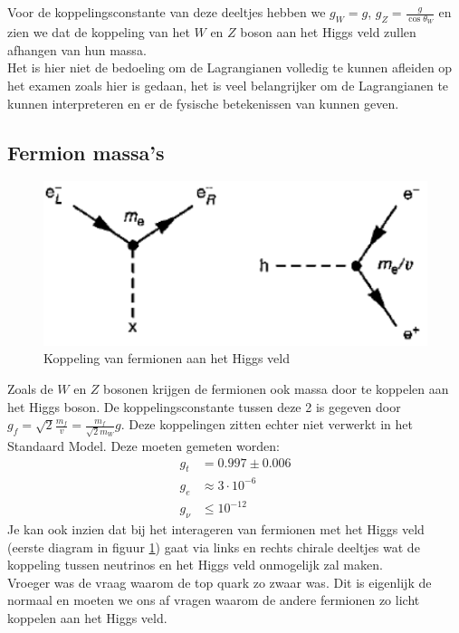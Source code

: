 \documentclass[../main.tex]{subfiles}
\begin{document}
Voor de koppelingsconstante van deze deeltjes hebben we $g_W=g$, $g_Z= \frac{g}{\cos\theta_W}$ en zien we dat de koppeling van het $W$ en $Z$ boson aan het Higgs veld zullen afhangen van hun massa.\\
{\color{red} Het is hier niet de bedoeling om de Lagrangianen volledig te kunnen afleiden op het examen zoals hier is gedaan, het is veel belangrijker om de Lagrangianen te kunnen interpreteren en er de fysische betekenissen van kunnen geven.}

\subsection{Fermion massa's}%
\label{sub:fermion_massa_s}

\begin{figure}[h]
    \centering
    \includegraphics[width=0.6\linewidth]{higgs_boson/koppeling_higgs_e.png}
    \caption{Koppeling van fermionen aan het Higgs veld}%
    \label{fig:higgs_boson/koppeling_higgs_e}
\end{figure}

Zoals de $W$ en $Z$ bosonen krijgen de fermionen ook massa door te koppelen aan het Higgs boson. De koppelingsconstante tussen deze 2 is gegeven door $g_f = \sqrt{2} \frac{m_f}{v} = \frac{m_f}{\sqrt{2}m_W} g$. Deze koppelingen zitten echter niet verwerkt in het Standaard Model. Deze moeten gemeten worden:
\begin{equation}
    \begin{aligned}
        \label{eq:kc_h_fermionen}
        g_t &= 0.997 \pm 0.006\\
        g_e &\approx 3\cdot 10^{-6}\\
        g_\nu &\leq 10^{-12}
    \end{aligned}
\end{equation}
Je kan ook inzien dat bij het interageren van fermionen met het Higgs veld (eerste diagram in figuur \ref{fig:higgs_boson/koppeling_higgs_e}) gaat via links en rechts chirale deeltjes wat de koppeling tussen neutrinos en het Higgs veld onmogelijk zal maken.\\
Vroeger was de vraag waarom de top quark zo zwaar was. Dit is eigenlijk de normaal en moeten we ons af vragen waarom de andere fermionen zo licht koppelen aan het Higgs veld.
\end{document}
